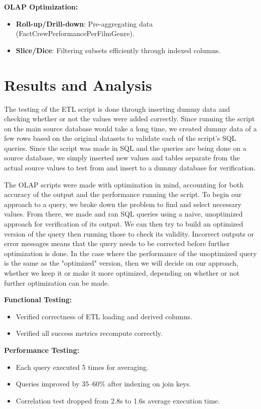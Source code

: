 \textbf{OLAP Optimization:}
\begin{itemize}
	\item \textbf{Roll-up/Drill-down}: Pre-aggregating data (FactCrewPerformancePerFilmGenre).
	\item \textbf{Slice/Dice}: Filtering subsets efficiently through indexed columns.
\end{itemize}

\section{Results and Analysis}

The testing of the ETL script is done through inserting dummy data and checking whether or not the values were added correctly. Since running the script on the main source database would take a long time, we created dummy data of a few rows based on the original datasets to validate each of the script's SQL queries. Since the script was made in SQL and the queries are being done on a source database, we simply inserted new values and tables separate from the actual source values to test from and insert to a dummy database for verification. 

The OLAP scripts were made with optimization in mind, accounting for both accuracy of the output and the performance running the script. To begin our approach to a query, we broke down the problem to find and select necessary values. From there, we made and ran SQL queries using a naive, unoptimized approach for verification of its output. We can then try to build an optimized version of the query then running those to check its validity. Incorrect outputs or error messages means that the query needs to be corrected before further optimization is done. In the case where the performance of the unoptimized query is the same as the "optimized" version, then we will decide on our approach, whether we keep it or make it more optimized, depending on whether or not further optimization can be made.

\textbf{Functional Testing:}
\begin{itemize}
	\item Verified correctness of ETL loading and derived columns.
	\item Verified all success metrics recompute correctly.
\end{itemize}

\textbf{Performance Testing:}
\begin{itemize}
	\item Each query executed 5 times for averaging.
	\item Queries improved by 35--60\% after indexing on join keys.
	\item Correlation test dropped from 2.8s to 1.6s average execution time.
\end{itemize}

